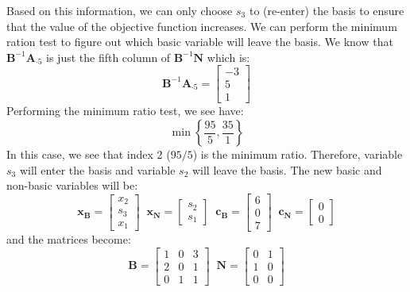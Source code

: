 \begin{example}
Based on this information, we can only choose $s_3$ to (re-enter) the basis to ensure that the value of the objective function increases. We can perform the minimum ration test to figure out which basic variable will leave the basis. We know that $\mathbf{B}^{-1}\mathbf{A}_{\cdot 5}$ is just the fifth column of $\mathbf{B}^{-1}\mathbf{N}$ which is:
\begin{displaymath}
\mathbf{B}^{-1}\mathbf{A}_{\cdot 5} = \begin{bmatrix}
-3\\
5\\
1
\end{bmatrix}
\end{displaymath}
Performing the minimum ratio test, we see have:
\begin{displaymath}
\min\left\{\frac{95}{5},\frac{35}{1}\right\}
\end{displaymath}
In this case, we see that index 2 ($95/5$) is the minimum ratio. Therefore, variable $s_3$ will enter the basis and variable $s_2$ will leave the basis. The new basic and non-basic variables will be:
\begin{displaymath}
\mathbf{x_B} = \begin{bmatrix}x_2\\s_3\\x_1\end{bmatrix}\;\;
\mathbf{x_N} = \begin{bmatrix}s_2\\s_1\end{bmatrix}\;\;
\mathbf{c_B} = \begin{bmatrix}6\\0\\7\end{bmatrix}\;\;
\mathbf{c_N} = \begin{bmatrix}0\\0\end{bmatrix}
\end{displaymath}
and the matrices become:
\begin{displaymath}
\mathbf{B} = \begin{bmatrix}
1 & 0 & 3\\
2 & 0 & 1\\
0 & 1 & 1
\end{bmatrix}\;\;
\mathbf{N} = \begin{bmatrix}
0 & 1\\
1 & 0\\
0 & 0
\end{bmatrix}
\end{displaymath}

\end{example}
